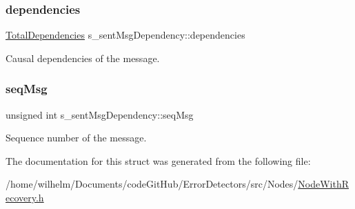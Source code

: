 \subsubsection{\texorpdfstring{dependencies}{dependencies}}
{\footnotesize\ttfamily \hyperlink{class_total_dependencies}{Total\+Dependencies} s\+\_\+sent\+Msg\+Dependency\+::dependencies}



Causal dependencies of the message. 

\mbox{\label{structs__sent_msg_dependency_afd3ba2f762d695961fed00fb401bc3e7}} 
\subsubsection{\texorpdfstring{seq\+Msg}{seqMsg}}
{\footnotesize\ttfamily unsigned int s\+\_\+sent\+Msg\+Dependency\+::seq\+Msg}



Sequence number of the message. 



The documentation for this struct was generated from the following file\+:\begin{DoxyCompactItemize}
\item 
/home/wilhelm/\+Documents/code\+Git\+Hub/\+Error\+Detectors/src/\+Nodes/\hyperlink{_node_with_recovery_8h}{Node\+With\+Recovery.\+h}\end{DoxyCompactItemize}
